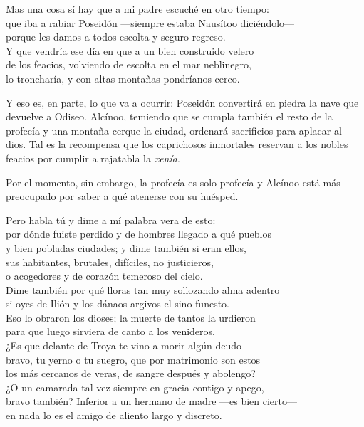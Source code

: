 \begin{versocita}
Mas una cosa sí hay que a mi padre escuché en otro tiempo:\\
que iba a rabiar Poseidón ---siempre estaba Nausítoo diciéndolo---\\
porque les damos a todos escolta y seguro regreso.\\
Y que vendría ese día en que a un bien construido velero\\
de los feacios, volviendo de escolta en el mar neblinegro,\\
lo troncharía, y con altas montañas pondríanos cerco.
\end{versocita}

Y eso es, en parte, lo que va a ocurrir: Poseidón convertirá en piedra la nave que devuelve a Odiseo. Alcínoo, temiendo que se cumpla también el resto de la profecía y una montaña cerque la ciudad, ordenará sacrificios para aplacar al dios. Tal es la recompensa que los caprichosos inmortales reservan a los nobles feacios por cumplir a rajatabla la \emph{xenía}.

Por el momento, sin embargo, la profecía es solo profecía y Alcínoo está más preocupado por saber a qué atenerse con su huésped.

\begin{versocita}
Pero habla tú y dime a mí palabra vera de esto:\\
por dónde fuiste perdido y de hombres llegado a qué pueblos\\
y bien pobladas ciudades; y dime también si eran ellos,\\
sus habitantes, brutales, difíciles, no justicieros,\\
o acogedores y de corazón temeroso del cielo.\\
Dime también por qué lloras tan muy sollozando alma adentro\\
si oyes de Ilión y los dánaos argivos el sino funesto.\\
Eso lo obraron los dioses; la muerte de tantos la urdieron\\
para que luego sirviera de canto a los venideros.\\
¿Es que delante de Troya te vino a morir algún deudo\\
bravo, tu yerno o tu suegro, que por matrimonio son estos\\
los más cercanos de veras, de sangre después y abolengo?\\
¿O un camarada tal vez siempre en gracia contigo y apego,\\
bravo también? Inferior a un hermano de madre ---es bien cierto---\\
en nada lo es el amigo de aliento largo y discreto.
\end{versocita}

